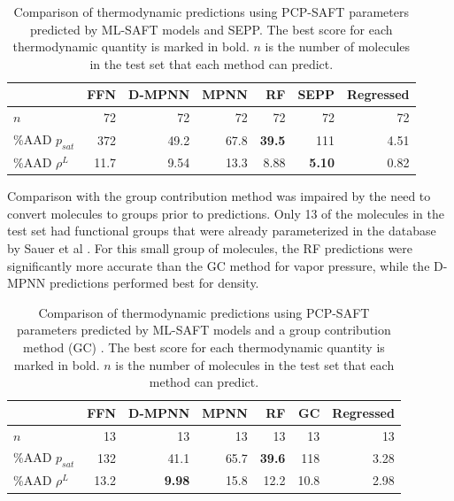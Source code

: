 \begin{table}
	\caption{Comparison of thermodynamic predictions using PCP-SAFT parameters predicted by ML-SAFT models and SEPP.\cite{Kaminski2020} The best score for each thermodynamic quantity is marked in bold. $n$ is the number of molecules in the test set that each method can predict.}
        \label{tab:sepp}
	\begin{center}
        \begin{tabular}{lrrrrr|r}
            & FFN & D-MPNN & MPNN & RF & SEPP & Regressed \\
            \hline
            $n$ & 72 & 72 & 72 & 72 & 72 & 72 \\
            \%AAD $p_{sat}$ & 372 & 49.2 & 67.8 & \textbf{39.5} & 111 & 4.51 \\
            \%AAD $\rho^{L}$ & 11.7 & 9.54 & 13.3 & 8.88 &\textbf{5.10} & 0.82 \\
        \end{tabular}
	\end{center}
\end{table}

Comparison with the group contribution method was impaired by the need to convert molecules to groups prior to predictions. Only 13 of the molecules in the test set had functional groups that were already parameterized in the database by Sauer et al \cite{Sauer2014}. For this small group of molecules, the RF predictions were significantly more accurate than the GC method for vapor pressure, while the D-MPNN predictions performed best for density. 


\begin{table}
	\caption{Comparison of thermodynamic predictions using PCP-SAFT parameters predicted by ML-SAFT models and a group contribution method (GC) \cite{Sauer2014}. The best score for each thermodynamic quantity  is marked in bold. $n$ is the number of molecules in the test set that each method can predict.}
    \label{tab:gc}
	\begin{center}
		\begin{tabular}{lrrrrr|r}
			 & FFN & D-MPNN & MPNN & RF & GC & Regressed \\
			\hline
			$n$ & 13 & 13 & 13 & 13 & 13 & 13 \\
			\%AAD $p_{sat}$ & 132 & 41.1 & 65.7 & \textbf{39.6} & 118 & 3.28 \\
			\%AAD $\rho^{L}$ & 13.2 & \textbf{9.98} & 15.8 & 12.2 & 10.8 & 2.98 \\
		\end{tabular}
	\end{center}
\end{table}

